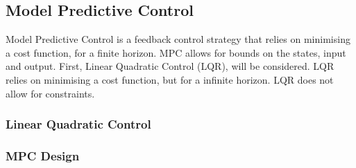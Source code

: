 \subsection{Model Predictive Control}
Model Predictive Control is a feedback control strategy that relies on minimising a cost function, for a finite horizon. MPC allows for bounds on the states, input and output. First, Linear Quadratic Control (LQR), will be considered. LQR relies on minimising a cost function, but for a infinite horizon. LQR does not allow for constraints.
\subsubsection{Linear Quadratic Control}

\subsubsection{MPC Design}